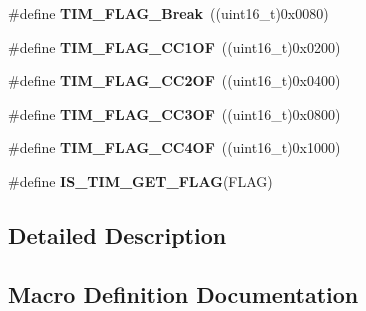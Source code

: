 \begin{DoxyCompactItemize}
\item 
\#define {\bfseries T\+I\+M\+\_\+\+F\+L\+A\+G\+\_\+\+Break}~((uint16\+\_\+t)0x0080)\hypertarget{group___t_i_m___flags_ga166571a1d5ca2bfca5d923eaa22f6deb}{}\label{group___t_i_m___flags_ga166571a1d5ca2bfca5d923eaa22f6deb}

\item 
\#define {\bfseries T\+I\+M\+\_\+\+F\+L\+A\+G\+\_\+\+C\+C1\+OF}~((uint16\+\_\+t)0x0200)\hypertarget{group___t_i_m___flags_ga38dfb7d1ed00af77d70bc3be28500108}{}\label{group___t_i_m___flags_ga38dfb7d1ed00af77d70bc3be28500108}

\item 
\#define {\bfseries T\+I\+M\+\_\+\+F\+L\+A\+G\+\_\+\+C\+C2\+OF}~((uint16\+\_\+t)0x0400)\hypertarget{group___t_i_m___flags_ga4df0c71d3e695c214d49802942e04590}{}\label{group___t_i_m___flags_ga4df0c71d3e695c214d49802942e04590}

\item 
\#define {\bfseries T\+I\+M\+\_\+\+F\+L\+A\+G\+\_\+\+C\+C3\+OF}~((uint16\+\_\+t)0x0800)\hypertarget{group___t_i_m___flags_gac81f24eaffdf83c2db9d2e6078a00919}{}\label{group___t_i_m___flags_gac81f24eaffdf83c2db9d2e6078a00919}

\item 
\#define {\bfseries T\+I\+M\+\_\+\+F\+L\+A\+G\+\_\+\+C\+C4\+OF}~((uint16\+\_\+t)0x1000)\hypertarget{group___t_i_m___flags_gafc8b04654766d98ba2c6fed601895a20}{}\label{group___t_i_m___flags_gafc8b04654766d98ba2c6fed601895a20}

\item 
\#define {\bfseries I\+S\+\_\+\+T\+I\+M\+\_\+\+G\+E\+T\+\_\+\+F\+L\+AG}(F\+L\+AG)
\end{DoxyCompactItemize}


\subsection{Detailed Description}


\subsection{Macro Definition Documentation}
